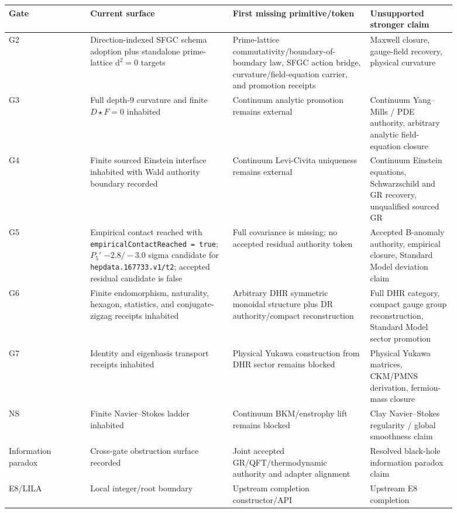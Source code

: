 \documentclass[11pt]{article}
\theoremstyle{definition}
\theoremstyle{plain}
\theoremstyle{remark}
\begin{document}
\begin{longtable}{p{0.16\linewidth}p{0.29\linewidth}p{0.27\linewidth}p{0.17\linewidth}}
\toprule
Gate & Current surface & First missing primitive/token & Unsupported stronger claim \\
\midrule
G2 & Direction-indexed SFGC schema adoption plus standalone prime-lattice \(\mathrm{d}^2=0\) targets & Prime-lattice commutativity/boundary-of-boundary law, SFGC action bridge, curvature/field-equation carrier, and promotion receipts & Maxwell closure, gauge-field recovery, physical curvature \\
G3 & Full depth-9 curvature and finite \(D \star F = 0\) inhabited & Continuum analytic promotion remains external & Continuum Yang--Mills / PDE authority, arbitrary analytic field-equation closure \\
G4 & Finite sourced Einstein interface inhabited with Wald authority boundary recorded & Continuum Levi-Civita uniqueness remains external & Continuum Einstein equations, Schwarzschild and GR recovery, unqualified sourced GR \\
G5 & Empirical contact reached with \texttt{empiricalContactReached = true}; \(P_5'\) \(-2.8/-3.0\) sigma candidate for \texttt{hepdata.167733.v1/t2}; accepted residual candidate is false & Full covariance is missing; no accepted residual authority token & Accepted B-anomaly authority, empirical closure, Standard Model deviation claim \\
G6 & Finite endomorphism, naturality, hexagon, statistics, and conjugate-zigzag receipts inhabited & Arbitrary DHR symmetric monoidal structure plus DR authority/compact reconstruction & Full DHR category, compact gauge group reconstruction, Standard Model sector promotion \\
G7 & Identity and eigenbasis transport receipts inhabited & Physical Yukawa construction from DHR sector remains blocked & Physical Yukawa matrices, CKM/PMNS derivation, fermion-mass closure \\
NS & Finite Navier--Stokes ladder inhabited & Continuum BKM/enstrophy lift remains blocked & Clay Navier--Stokes regularity / global smoothness claim \\
Information paradox & Cross-gate obstruction surface recorded & Joint accepted GR/QFT/thermodynamic authority and adapter alignment & Resolved black-hole information paradox claim \\
E8/LILA & Local integer/root boundary & Upstream completion constructor/API & Upstream E8 completion \\

\end{longtable}
\end{document}
